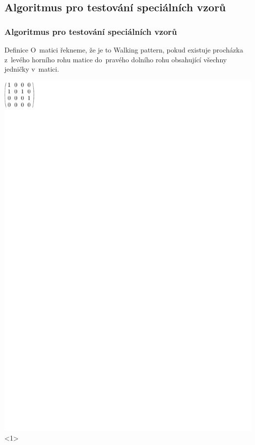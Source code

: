 \documentclass{beamer}
\begin{document}
\subsection{Algoritmus pro testování speciálních vzorů}
\begin{frame}
\frametitle{Algoritmus pro testování speciálních vzorů}
\begin{block}{Definice}
O~matici řekneme, že je to \alert{Walking pattern}, pokud existuje procházka z~levého horního rohu matice do~pravého dolního rohu obsahující všechny jedničky v~matici.
\end{block}
\vspace{5mm}
\centering
\includegraphics{../img/walkingexample1.pdf}<1>

\end{frame}
\end{document}
